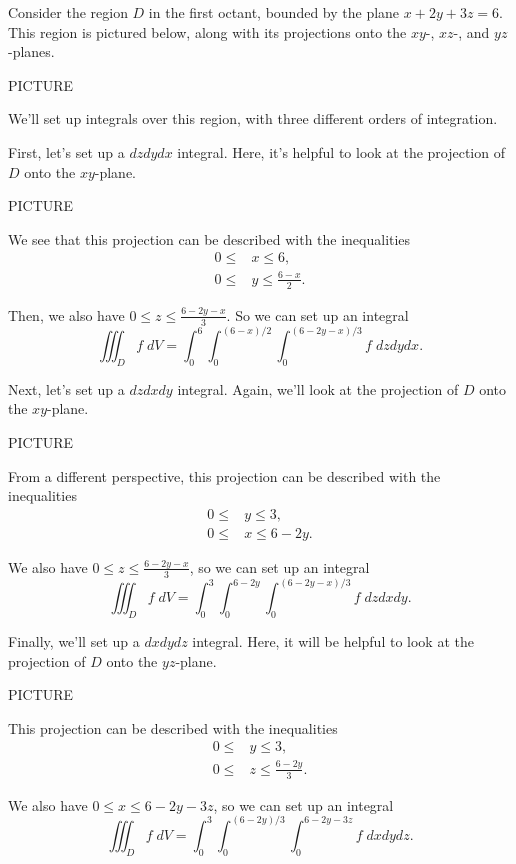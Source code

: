 \documentclass{ximera}
\begin{document}
\begin{example}
Consider the region $D$ in the first octant, bounded by the plane $x+2y+3z = 6$. This region is pictured below, along with its projections onto the $xy$-, $xz$-, and $yz$-planes. 

PICTURE

We'll set up integrals over this region, with three different orders of integration.

First, let's set up a $dzdydx$ integral. Here, it's helpful to look at the projection of $D$ onto the $xy$-plane.

PICTURE

We see that this projection can be described with the inequalities
\begin{align*}
0\leq &x\leq 6,\\
0\leq &y\leq \frac{6-x}{2}.
\end{align*}

Then, we also have $0\leq z\leq \frac{6-2y-x}{3}$. So we can set up an integral
\[
\iiint_D f\;dV = \int_0^6\int_0^{(6-x)/2}\int_0^{(6-2y-x)/3} f\;dzdydx.
\]

Next, let's set up a $dzdxdy$ integral. Again, we'll look at the projection of $D$ onto the $xy$-plane. 

PICTURE

From a different perspective, this projection can be described with the inequalities
\begin{align*}
0\leq &y\leq 3,\\
0\leq &x\leq 6-2y.
\end{align*}

We also have $0\leq z\leq \frac{6-2y-x}{3}$, so we can set up an integral
\[
\iiint_D f\;dV = \int_0^3\int_0^{6-2y}\int_0^{(6-2y-x)/3} f\;dzdxdy.
\]

Finally, we'll set up a $dxdydz$ integral. Here, it will be helpful to look at the projection of $D$ onto the $yz$-plane.

PICTURE

This projection can be described with the inequalities
\begin{align*}
0\leq &y\leq 3,\\
0\leq &z\leq \frac{6-2y}{3}.
\end{align*}

We also have $0\leq x\leq 6-2y-3z$, so we can set up an integral
\[
\iiint_D f\;dV = \int_0^3\int_0^{(6-2y)/3}\int_0^{6-2y-3z} f\;dxdydz.
\]
\end{example}
\end{document}

